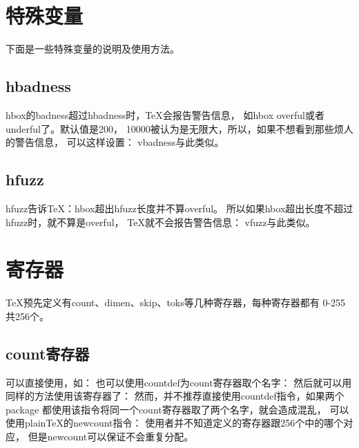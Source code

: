 ﻿\documentclass{article}
\begin{document}
  
  \section[特殊变量]{特殊变量}
  下面是一些特殊变量的说明及使用方法。
  
  \subsection[hbadness]{\bs hbadness}
  \bs hbox的badness超过hbadness时，\TeX{}会报告警告信息，
  如\bs hbox overful或者underful了。默认值是200，
  10000被认为是无限大，所以，如果不想看到那些烦人的警告信息，
  可以这样设置：
  \bs vbadness与此类似。
  
  \subsection[hfuzz]{\bs hfuzz}
  \bs hfuzz告诉\TeX{}：\bs hbox超出\bs hfuzz长度并不算overful。
  所以如果\bs hbox超出长度不超过\bs hfuzz时，就不算是overful，
  \TeX{}就不会报告警告信息：
  \bs vfuzz与此类似。
  
  
  \section[寄存器]{寄存器}
  \TeX{}预先定义有count、dimen、skip、toks等几种寄存器，每种寄存器都有
  0-255共256个。
  
  \subsection[count寄存器]{count寄存器}
  可以直接使用，如：
  也可以使用\bs countdef为count寄存器取个名字：
  然后就可以用同样的方法使用该寄存器了：
  然而，并不推荐直接使用\bs countdef指令，如果两个package
  都使用该指令将同一个count寄存器取了两个名字，就会造成混乱，
  可以使用plain\TeX{}的\bs newcount指令：
  使用者并不知道定义的寄存器跟256个中的哪个对应，
  但是\bs newcount可以保证不会重复分配。


\end{document}
